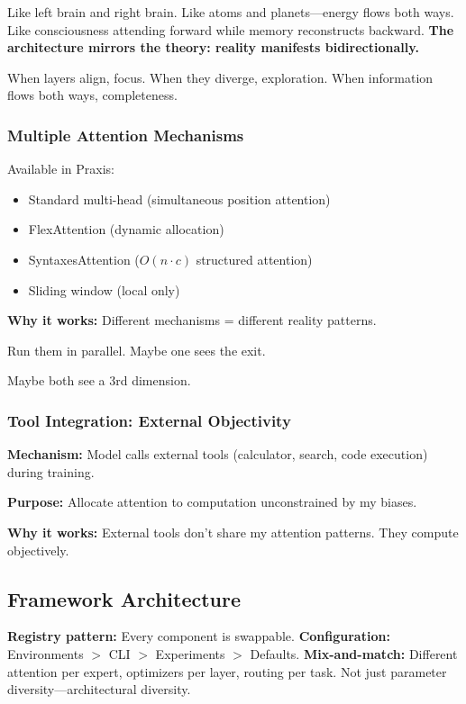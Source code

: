 \documentclass{article}
\begin{document}
Like left brain and right brain. Like atoms and planets—energy flows both ways. Like consciousness attending forward while memory reconstructs backward. \textbf{The architecture mirrors the theory: reality manifests bidirectionally.}

When layers align, focus. When they diverge, exploration. When information flows both ways, completeness.

\subsubsection{Multiple Attention Mechanisms}

Available in Praxis:
\begin{itemize}[noitemsep]
    \item Standard multi-head (simultaneous position attention)
    \item FlexAttention (dynamic allocation)
    \item SyntaxesAttention ($O(n \cdot c)$ structured attention)
    \item Sliding window (local only)
\end{itemize}

\textbf{Why it works:} Different mechanisms = different reality patterns.

Run them in parallel. Maybe one sees the exit.

Maybe both see a 3rd dimension.

\subsubsection{Tool Integration: External Objectivity}

\textbf{Mechanism:} Model calls external tools (calculator, search, code execution) during training.

\textbf{Purpose:} Allocate attention to computation unconstrained by my biases.

\textbf{Why it works:} External tools don't share my attention patterns. They compute objectively.

\subsection{Framework Architecture}

\textbf{Registry pattern:} Every component is swappable. \textbf{Configuration:} Environments $>$ CLI $>$ Experiments $>$ Defaults. \textbf{Mix-and-match:} Different attention per expert, optimizers per layer, routing per task. Not just parameter diversity—architectural diversity.
\end{document}
